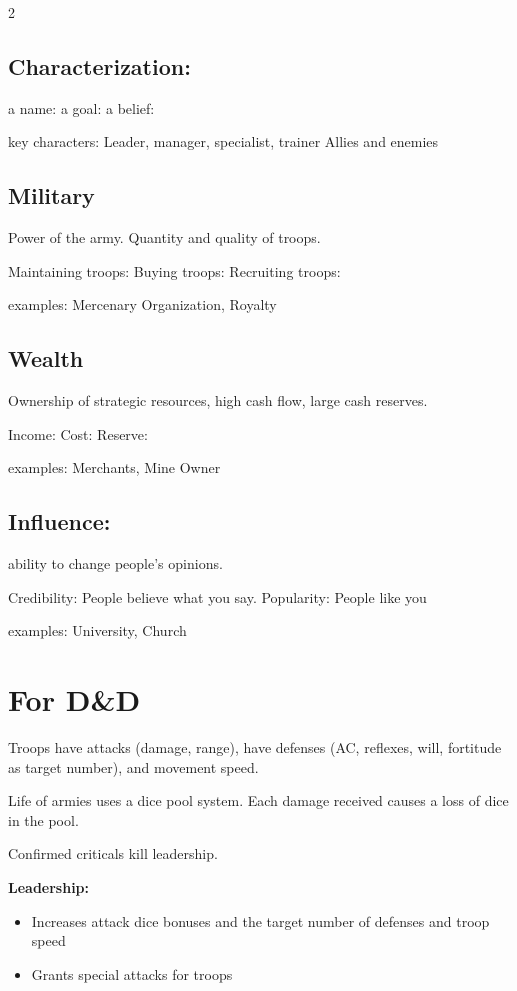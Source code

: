 \begin{multicols}{2}
\subsection{Characterization:}

a name:
a goal:
a belief:

key characters: Leader, manager, specialist, trainer 
Allies and enemies

\subsection{Military}
Power of the army. 
Quantity and quality of troops.

Maintaining troops:
Buying troops: 
Recruiting troops:

examples: Mercenary Organization, Royalty

\subsection{Wealth}
Ownership of strategic resources, high cash flow, large cash reserves.

Income:
Cost:
Reserve:

examples: Merchants, Mine Owner

\subsection{Influence:}
ability to change people's opinions.

Credibility: People believe what you say.
Popularity: People like you

examples: University, Church

\section{For D\&D}

\enlargethispage{2\baselineskip}

Troops have attacks (damage, range), have defenses (AC, reflexes, will, fortitude as target number), and movement speed.

Life of armies uses a dice pool system. Each damage received causes a loss of dice in the pool.

Confirmed criticals kill leadership.

\textbf{Leadership:}

\begin{itemize}
    \setlength\itemsep{0em}
    \setlength{\parskip}{0em}
    \item Increases attack dice bonuses and the target number of defenses and troop speed
    \item Grants special attacks for troops
\end{itemize}


\end{multicols}
